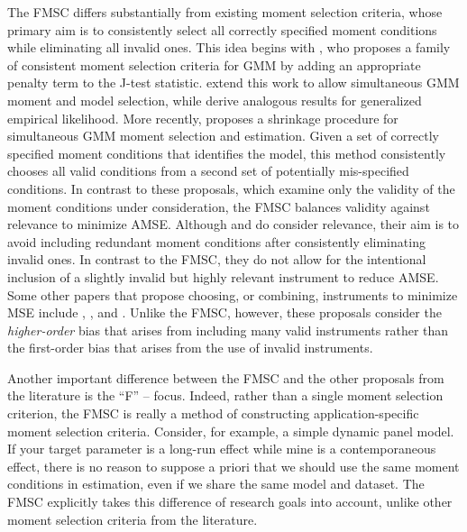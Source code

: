 The FMSC differs substantially from existing moment selection criteria, whose primary aim is to consistently select all correctly specified moment conditions while eliminating all invalid ones.
This idea begins with \cite{Andrews1999}, who proposes a family of consistent moment selection criteria for GMM by adding an appropriate penalty term to the J-test statistic. 
\cite{AndrewsLu} extend this work to allow simultaneous GMM moment and model selection, while \cite{HongPrestonShum} derive analogous results for generalized empirical likelihood. 
More recently, \cite{Liao} proposes a shrinkage procedure for simultaneous GMM moment selection and estimation. 
Given a set of correctly specified moment conditions that identifies the model, this method consistently chooses all valid conditions from a second set of potentially mis-specified conditions.
In contrast to these proposals, which examine only the validity of the moment conditions under consideration, the FMSC balances validity against relevance to minimize AMSE.
Although \cite{HallPeixe2003} and \cite{ChengLiao} do consider relevance, their aim is to avoid including redundant moment conditions after consistently eliminating invalid ones.
In contrast to the FMSC, they do not allow for the intentional inclusion of a slightly invalid but highly relevant instrument to reduce AMSE. 
Some other papers that propose choosing, or combining, instruments to minimize MSE include \cite{DonaldNewey2001}, \cite{DonaldImbensNewey2009}, and \cite{KuersteinerOkui2010}.
Unlike the FMSC, however, these proposals consider the \emph{higher-order} bias that arises from including many valid instruments rather than the first-order bias that arises from the use of invalid instruments.

Another important difference between the FMSC and the other proposals from the literature is the ``F'' -- focus. 
Indeed, rather than a single moment selection criterion, the FMSC is really a method of constructing application-specific moment selection criteria.
Consider, for example, a simple dynamic panel model. If your target parameter is a long-run effect while mine is a contemporaneous effect, there is no reason to suppose a priori that we should use the same moment conditions in estimation, even if we share the same model and dataset.
The FMSC explicitly takes this difference of research goals into account, unlike other moment selection criteria from the literature.

